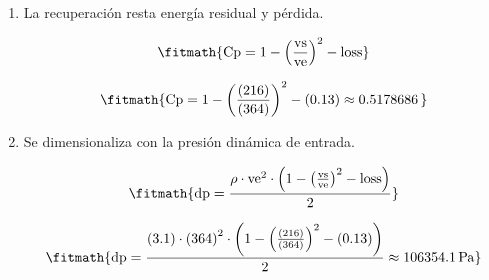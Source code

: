 \begin{enumerate}

\item La recuperación resta energía residual y pérdida.

\[\fitmath{\mathrm{Cp}=1-{\left(\frac{\mathrm{vs}}{\mathrm{ve}}\right)}^{2}-\mathrm{loss}}\]

\[\fitmath{\mathrm{Cp}=1-{\left(\frac{(216)}{(364)}\right)}^{2}-(0.13)\approx 0.5178686\,}\]

\item Se dimensionaliza con la presión dinámica de entrada.

\[\fitmath{\mathrm{dp}=\frac{\rho\cdot {\mathrm{ve}}^{2}\cdot \left(1-{\left(\frac{\mathrm{vs}}{\mathrm{ve}}\right)}^{2}-\mathrm{loss}\right)}{2}}\]

\[\fitmath{\mathrm{dp}=\frac{(3.1)\cdot {(364)}^{2}\cdot \left(1-{\left(\frac{(216)}{(364)}\right)}^{2}-(0.13)\right)}{2}\approx 106354.1\,\mathrm{Pa}}\]

\end{enumerate}
